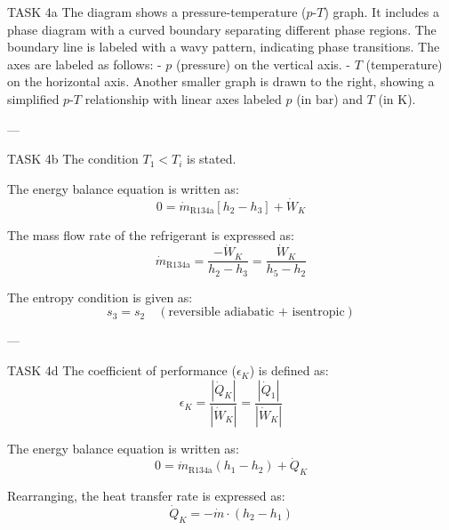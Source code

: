TASK 4a  
The diagram shows a pressure-temperature (\(p\)-\(T\)) graph. It includes a phase diagram with a curved boundary separating different phase regions. The boundary line is labeled with a wavy pattern, indicating phase transitions. The axes are labeled as follows:
- \(p\) (pressure) on the vertical axis.
- \(T\) (temperature) on the horizontal axis.
Another smaller graph is drawn to the right, showing a simplified \(p\)-\(T\) relationship with linear axes labeled \(p\) (in \(\text{bar}\)) and \(T\) (in \(\text{K}\)).

---

TASK 4b  
The condition \(T_1 < T_i\) is stated.  

The energy balance equation is written as:  
\[
0 = \dot{m}_{\text{R134a}} \left[ h_2 - h_3 \right] + \dot{W}_K
\]

The mass flow rate of the refrigerant is expressed as:  
\[
\dot{m}_{\text{R134a}} = \frac{-\dot{W}_K}{h_2 - h_3} = \frac{\dot{W}_K}{h_5 - h_2}
\]

The entropy condition is given as:  
\[
s_3 = s_2 \quad (\text{reversible adiabatic + isentropic})
\]

---

TASK 4d  
The coefficient of performance (\(\epsilon_K\)) is defined as:  
\[
\epsilon_K = \frac{\left| \dot{Q}_K \right|}{\left| \dot{W}_K \right|} = \frac{\left| \dot{Q}_1 \right|}{\left| \dot{W}_K \right|}
\]

The energy balance equation is written as:  
\[
0 = \dot{m}_{\text{R134a}} \left( h_1 - h_2 \right) + \dot{Q}_K
\]

Rearranging, the heat transfer rate is expressed as:  
\[
\dot{Q}_K = -\dot{m} \cdot \left( h_2 - h_1 \right)
\]